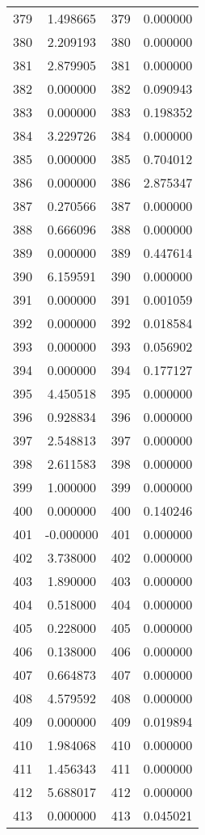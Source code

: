 \documentclass[12pt]{article}
\begin{document}
\begin{longtable}{@{}cccc@{}}
379 & 1.498665 & 379 & 0.000000 \\
380 & 2.209193 & 380 & 0.000000 \\
381 & 2.879905 & 381 & 0.000000 \\
382 & 0.000000 & 382 & 0.090943 \\
383 & 0.000000 & 383 & 0.198352 \\
384 & 3.229726 & 384 & 0.000000 \\
385 & 0.000000 & 385 & 0.704012 \\
386 & 0.000000 & 386 & 2.875347 \\
387 & 0.270566 & 387 & 0.000000 \\
388 & 0.666096 & 388 & 0.000000 \\
389 & 0.000000 & 389 & 0.447614 \\
390 & 6.159591 & 390 & 0.000000 \\
391 & 0.000000 & 391 & 0.001059 \\
392 & 0.000000 & 392 & 0.018584 \\
393 & 0.000000 & 393 & 0.056902 \\
394 & 0.000000 & 394 & 0.177127 \\
395 & 4.450518 & 395 & 0.000000 \\
396 & 0.928834 & 396 & 0.000000 \\
397 & 2.548813 & 397 & 0.000000 \\
398 & 2.611583 & 398 & 0.000000 \\
399 & 1.000000 & 399 & 0.000000 \\
400 & 0.000000 & 400 & 0.140246 \\
401 & -0.000000 & 401 & 0.000000 \\
402 & 3.738000 & 402 & 0.000000 \\
403 & 1.890000 & 403 & 0.000000 \\
404 & 0.518000 & 404 & 0.000000 \\
405 & 0.228000 & 405 & 0.000000 \\
406 & 0.138000 & 406 & 0.000000 \\
407 & 0.664873 & 407 & 0.000000 \\
408 & 4.579592 & 408 & 0.000000 \\
409 & 0.000000 & 409 & 0.019894 \\
410 & 1.984068 & 410 & 0.000000 \\
411 & 1.456343 & 411 & 0.000000 \\
412 & 5.688017 & 412 & 0.000000 \\
413 & 0.000000 & 413 & 0.045021 \\

\end{longtable}
\end{document}
